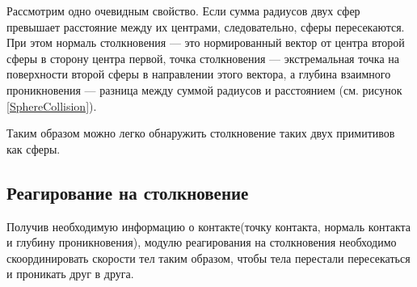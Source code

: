 Рассмотрим одно очевидным свойство. Если сумма радиусов двух сфер превышает расстояние между их центрами, следовательно, сферы пересекаются.
При этом нормаль столкновения --- это нормированный вектор от центра второй сферы в сторону центра первой,
точка столкновения --- экстремальная точка на поверхности второй сферы в направлении этого вектора, а глубина взаимного
проникновения --- разница между суммой радиусов и расстоянием (см. рисунок \ref{SphereCollision}). %

Таким образом можно легко обнаружить столкновение таких двух примитивов как сферы.
\subsection{Реагирование на столкновение}
Получив необходимую информацию о контакте(точку контакта, нормаль контакта и глубину проникновения), модулю реагирования
на столкновения необходимо скоординировать скорости тел таким образом, чтобы тела перестали пересекаться и проникать друг в друга.  
